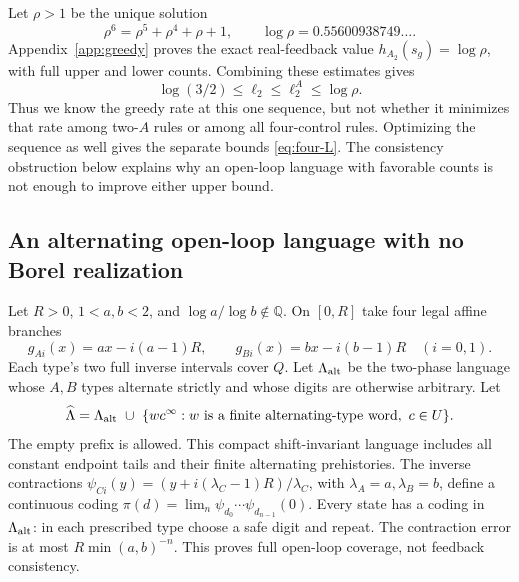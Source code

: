 \documentclass[11pt,reqno]{amsart}
\numberwithin{equation}{section}
\theoremstyle{definition}
\theoremstyle{definition}
\begin{document}
Let $\rho>1$ be the unique solution
\begin{equation}\label{eq:rho}
 \rho^6=\rho^5+\rho^4+\rho+1,
 \qquad\log\rho=0.55600938749\ldots.
\end{equation}
Appendix~\ref{app:greedy} proves the exact real-feedback value
$h_{A_2}(s_g)=\log\rho$, with full upper and lower counts.
Combining these estimates gives
\begin{equation}\label{eq:four-even}
 \log(3/2)\le\ell_2\le\ell_2^A\le\log\rho.
\end{equation}
Thus we know the greedy rate at this one sequence, but not whether
it minimizes that rate among two-$A$ rules or among all four-control
rules. Optimizing the sequence as well gives the separate bounds
\eqref{eq:four-L}. The consistency obstruction below explains why an
open-loop language with favorable counts is not enough to improve
either upper bound.


\subsection{An alternating open-loop language with no Borel realization}
Let $R>0$, $1<a,b<2$, and $\log a/\log b\notin\mathbb Q$.
On $[0,R]$ take four legal affine branches
\[
 g_{Ai}(x)=ax-i(a-1)R,\qquad
 g_{Bi}(x)=bx-i(b-1)R\quad(i=0,1).
\]
Each type's two full inverse intervals cover $Q$. Let
$\Lambda_{\rm alt}$ be the two-phase language whose $A,B$ types
alternate strictly and whose digits are otherwise arbitrary. Let
\[
 \widehat\Lambda=\Lambda_{\rm alt}\ \cup\
 \{w c^\infty:w\text{ is a finite alternating-type word},\ c\in U\}.
\]
The empty prefix is allowed. This compact shift-invariant language
includes all constant endpoint tails and their finite alternating
prehistories. The inverse contractions
$\psi_{Ci}(y)=(y+i(\lambda_C-1)R)/\lambda_C$, with
$\lambda_A=a,\lambda_B=b$, define a continuous coding
$\pi(d)=\lim_n\psi_{d_0}\cdots\psi_{d_{n-1}}(0)$.
Every state has a coding in $\Lambda_{\rm alt}$: in each prescribed
type choose a safe digit and repeat. The contraction error is at
most $R\min(a,b)^{-n}$. This proves full open-loop coverage, not
feedback consistency.
\end{document}
